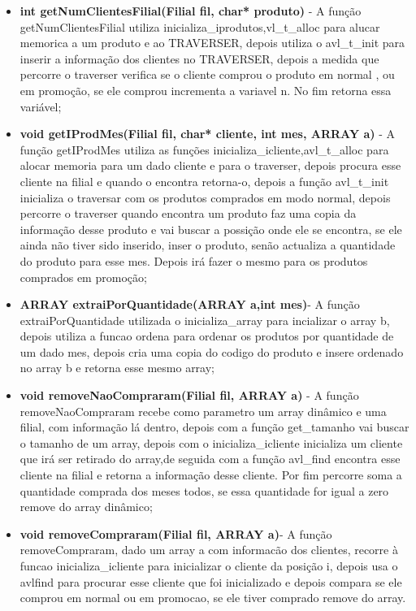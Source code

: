 \begin{itemize}
\item	\textbf{int getNumClientesFilial(Filial fil, char* produto)} - A função getNumClientesFilial utiliza inicializa\_iprodutos,vl\_t\_alloc para alucar memorica a um produto e ao TRAVERSER, depois utiliza o avl\_t\_init para inserir a informação dos clientes no TRAVERSER, depois a medida que percorre o traverser verifica se o cliente comprou o produto em normal , ou em promoção, se ele comprou incrementa a variavel n. 
No fim retorna essa variável; 

\item	\textbf{void getIProdMes(Filial fil, char* cliente, int mes, ARRAY a)} - A função getIProdMes utiliza as funções inicializa\_icliente,avl\_t\_alloc para alocar memoria para um dado cliente e para o traverser, depois procura esse cliente na filial e quando o encontra retorna-o, depois a função avl\_t\_init inicializa o traversar com os produtos comprados em modo normal, depois percorre o traverser quando encontra um produto faz uma copia da informação desse produto e vai buscar a possição onde ele se encontra, se ele ainda não tiver sido inserido, inser o produto, senão actualiza a quantidade do produto para esse mes. Depois irá fazer o mesmo para os produtos comprados em  promoção; 

\item	\textbf{ARRAY extraiPorQuantidade(ARRAY a,int mes)}- A função extraiPorQuantidade utilizada o inicializa\_array para incializar o array b, depois utiliza a funcao ordena
para ordenar os produtos por quantidade de um dado mes, depois cria uma copia do codigo do produto e insere ordenado no array b e retorna esse mesmo array; 

\item	\textbf{void removeNaoCompraram(Filial fil, ARRAY a)} - A função removeNaoCompraram recebe como parametro um array dinâmico e uma filial, com informação lá dentro, depois com a função get\_tamanho vai buscar o tamanho de um array, depois com o inicializa\_icliente inicializa um cliente que irá ser retirado do array,de seguida com a função avl\_find encontra esse cliente na filial e retorna a informação desse cliente. Por fim percorre soma a quantidade comprada dos meses todos, se essa quantidade for igual a zero remove do array dinâmico; 

\item	\textbf{void removeCompraram(Filial fil, ARRAY a)}- A função removeCompraram, dado um array a com informacão dos clientes, recorre à funcao inicializa\_icliente 
para inicializar o cliente da posição i, depois usa o avlfind 
para procurar esse cliente que foi inicializado e depois compara se ele comprou em normal ou em promocao, se ele tiver comprado remove do array. 
\end{itemize}


